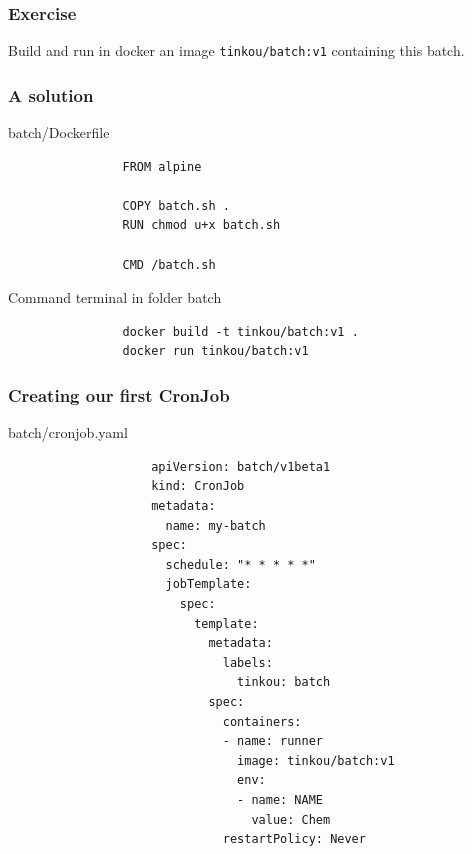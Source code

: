 	\begin{frame}[fragile]
		\frametitle{Exercise}
		
		Build and run in docker an image \verb|tinkou/batch:v1| containing this batch.
	\end{frame}

	\begin{frame}[fragile]
		\frametitle{A solution}
		
		\begin{block}{batch/Dockerfile}
			\begin{verbatim}
				FROM alpine
				
				COPY batch.sh .
				RUN chmod u+x batch.sh
				
				CMD /batch.sh
			\end{verbatim}
		\end{block}
		
		\begin{block}{Command terminal in folder batch}
			\begin{verbatim}
				docker build -t tinkou/batch:v1 .
				docker run tinkou/batch:v1
			\end{verbatim}
		\end{block}
	\end{frame}
				
	\begin{frame}[fragile]
		\frametitle{Creating our first CronJob}
		
		\begin{block}{batch/cronjob.yaml}
			\begin{tiny}
				\begin{verbatim}
					apiVersion: batch/v1beta1
					kind: CronJob
					metadata:
					  name: my-batch
					spec:
					  schedule: "* * * * *"
					  jobTemplate:
					    spec:
					      template:
					        metadata:
					          labels:
					            tinkou: batch
					        spec:
					          containers:
					          - name: runner
					            image: tinkou/batch:v1
					            env:
					            - name: NAME
					              value: Chem
					          restartPolicy: Never
				\end{verbatim}
			\end{tiny}
		\end{block}
	\end{frame}
	
